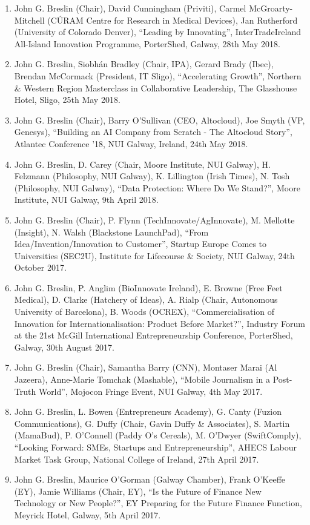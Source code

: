 \documentclass[10pt,a4paper]{res} %
\begin{document}
\begin{resume}
\begin{enumerate}
\item John G. Breslin (Chair), David Cunningham (Priviti), Carmel McGroarty-Mitchell (C\'{U}RAM Centre for Research in Medical Devices), Jan Rutherford (University of Colorado Denver), ``Leading by Innovating'', InterTradeIreland All-Island Innovation Programme, PorterShed, Galway, 28th May 2018.
\item John G. Breslin, Siobh\'{a}n Bradley (Chair, IPA), Gerard Brady (Ibec), Brendan McCormack (President, IT Sligo), ``Accelerating Growth'', Northern \& Western Region Masterclass in Collaborative Leadership, The Glasshouse Hotel, Sligo, 25th May 2018.
\item John G. Breslin (Chair), Barry O'Sullivan (CEO, Altocloud), Joe Smyth (VP, Genesys), ``Building an AI Company from Scratch - The Altocloud Story'', Atlantec Conference '18, NUI Galway, Ireland, 24th May 2018.
\item John G. Breslin, D. Carey (Chair, Moore Institute, NUI Galway), H. Felzmann (Philosophy, NUI Galway), K. Lillington (Irish Times), N. Tosh (Philosophy, NUI Galway), ``Data Protection: Where Do We Stand?'', Moore Institute, NUI Galway, 9th April 2018.
\item John G. Breslin (Chair), P. Flynn (TechInnovate/AgInnovate), M. Mellotte (Insight), N. Walsh (Blackstone LaunchPad), ``From Idea/Invention/Innovation to Customer'', Startup Europe Comes to Universities (SEC2U), Institute for Lifecourse \& Society, NUI Galway, 24th October 2017.
\item John G. Breslin, P. Anglim (BioInnovate Ireland), E. Browne (Free Feet Medical), D. Clarke (Hatchery of Ideas), A. Rialp (Chair, Autonomous University of Barcelona), B. Woods (OCREX), ``Commercialisation of Innovation for Internationalisation: Product Before Market?'', Industry Forum at the 21st McGill International Entrepreneurship Conference, PorterShed, Galway, 30th August 2017.
\item John G. Breslin (Chair), Samantha Barry (CNN), Montaser Marai (Al Jazeera), Anne-Marie Tomchak (Mashable), ``Mobile Journalism in a Post-Truth World'', Mojocon Fringe Event, NUI Galway, 4th May 2017.
\item John G. Breslin, L. Bowen (Entrepreneurs Academy), G. Canty (Fuzion Communications), G. Duffy (Chair, Gavin Duffy \& Associates), S. Martin (MamaBud), P. O'Connell (Paddy O's Cereals), M. O'Dwyer (SwiftComply), ``Looking Forward: SMEs, Startups and Entrepreneurship'', AHECS Labour Market Task Group, National College of Ireland, 27th April 2017.
\item John G. Breslin, Maurice O'Gorman (Galway Chamber), Frank O'Keeffe (EY), Jamie Williams (Chair, EY), ``Is the Future of Finance New Technology or New People?'', EY Preparing for the Future Finance Function, Meyrick Hotel, Galway, 5th April 2017.

\end{enumerate}
\end{resume}
\end{document}
